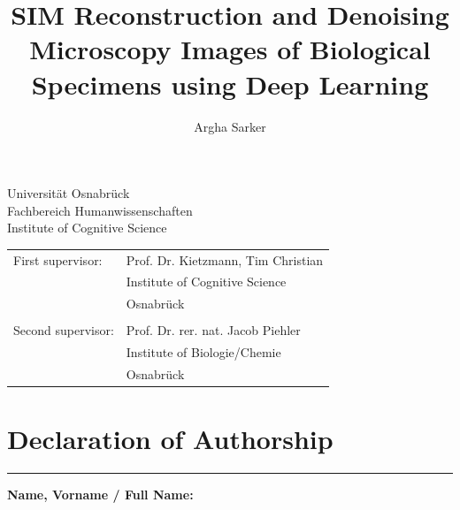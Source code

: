 \documentclass[11pt,
  paper=a4, 
  bibliography=totocnumbered,
	captions=tableheading,
	BCOR=10mm
]{scrreprt}
\title{SIM Reconstruction and Denoising Microscopy Images of Biological Specimens using Deep Learning}
\author{Argha Sarker}
\theoremstyle{definition}
\begin{document}
\begin{titlepage}
	\begin{flushleft}
		Universität Osnabrück\\
		Fachbereich Humanwissenschaften\\
		Institute of Cognitive Science
	\end{flushleft}

	\vspace{2cm}
	\vspace{1cm}

	\begin{tabular}{ll}
		First supervisor:  & Prof. Dr. Kietzmann, Tim Christian        \\
		                   & Institute of Cognitive Science             \\
		                   & Osnabrück                  \\\\
		Second supervisor: & Prof. Dr. rer. nat. Jacob Piehler      \\
		                   & Institute of Biologie/Chemie \\
		                   & Osnabrück
	\end{tabular}

\end{titlepage}


\chapter*{Declaration of Authorship}

\vspace{0.5cm} %

\noindent
\rule{\textwidth}{0.2pt} %
\vspace{0.2cm} %
\textbf{Name, Vorname / Full Name:} \\[0.2cm]
\end{document}
